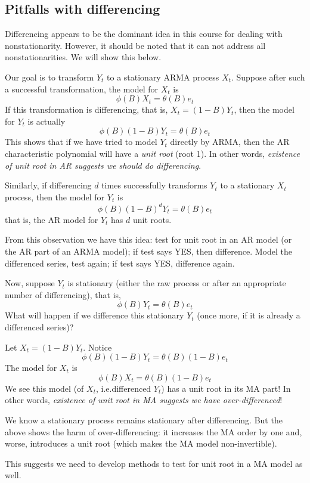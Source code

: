 \documentclass[12pt]{article}
\begin{document}
\begin{enumerate}
\subsection{Pitfalls with differencing}

Differencing appears to be the dominant idea in this course for dealing
with nonstationarity.
However, it should be noted that
it can not address all nonstationarities.
We will show this below.

Our goal is to transform $Y_t$ to a stationary ARMA process $X_t$.
Suppose after such a successful transformation,
the model for $X_t$ is
\[
\phi(B) X_t = \theta(B) e_t
\]
If this transformation is differencing, that is,
$X_t = (1 - B) Y_t$, then the model for $Y_t$ is actually
\[
\phi(B) (1-B) Y_t = \theta(B) e_t
\]
This shows that if we have tried to model $Y_t$ directly by ARMA,
then the AR characteristic polynomial will have a \emph{unit root}
(root 1).
In other words, \emph{existence of unit root in AR suggests
we should do differencing}.

Similarly, if differencing $d$ times successfully transforms $Y_t$
to a stationary $X_t$ process, then the model for $Y_t$ is
\[
\phi(B) (1-B)^d Y_t = \theta(B) e_t
\]
that is, the AR model for $Y_t$ has $d$ unit roots.

From this observation we have this idea:
test for unit root in an AR model (or the AR part of an ARMA model);
if test says YES, then difference.
Model the differenced series, test again;
if test says YES, difference again.

Now, suppose $Y_t$ is stationary (either the raw process or after
an appropriate number of differencing),
that is,
\[
\phi(B) Y_t = \theta(B) e_t
\]
What will happen if we difference this stationary $Y_t$
(once more, if it is already a differenced series)?

Let $X_t = (1-B)Y_t$.
Notice
\[
\phi(B) (1-B) Y_t = \theta(B) (1-B) e_t
\]
The model for $X_t$ is
\[
\phi(B) X_t = \theta(B) (1-B) e_t
\]
We see this model (of $X_t$, i.e.\@ differenced $Y_t$)
has a unit root in its MA part!
In other words,
\emph{existence of unit root in MA suggests we have over-differenced}!

We know a stationary process remains stationary after differencing.
But the above shows the harm of over-differencing:
it increases the MA order by one and, worse, introduces a unit root
(which makes the MA model non-invertible).

This suggests we need to develop methods to test for unit root
in a MA model as well.


\end{enumerate}
\end{document}
